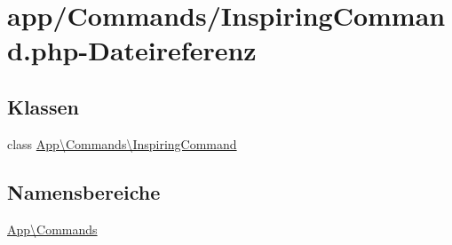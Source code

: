 \hypertarget{InspiringCommand_8php}{}\section{app/\+Commands/\+Inspiring\+Command.php-\/\+Dateireferenz}
\label{InspiringCommand_8php}
\subsection*{Klassen}
\begin{DoxyCompactItemize}
\item 
class \hyperlink{classApp_1_1Commands_1_1InspiringCommand}{App\textbackslash{}\+Commands\textbackslash{}\+Inspiring\+Command}
\end{DoxyCompactItemize}
\subsection*{Namensbereiche}
\begin{DoxyCompactItemize}
\item 
 \hyperlink{namespaceApp_1_1Commands}{App\textbackslash{}\+Commands}
\end{DoxyCompactItemize}
